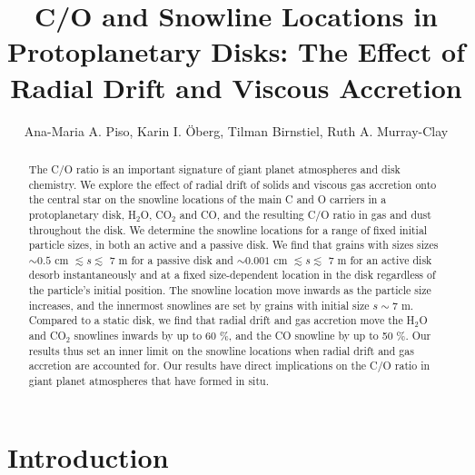 \documentclass[apj]{emulateapj}
\newcommand{\emgr}[1]{\emph{ \color{gray} #1}}
\begin{document}


\title{C/O and Snowline Locations in Protoplanetary Disks: The Effect of Radial Drift and Viscous Accretion}

\author{Ana-Maria A. Piso, Karin I. \"Oberg, Tilman Birnstiel, Ruth A. Murray-Clay}


\begin{abstract}
The C/O ratio is an important signature of giant planet atmospheres and disk chemistry. We explore the effect of radial drift of solids and viscous gas accretion onto the central star on the snowline locations of the main C and O carriers in a protoplanetary disk, H$_2$O, CO$_2$ and CO, and the resulting C/O ratio in gas and dust throughout the disk. We determine the snowline locations for a range of fixed initial particle sizes, in both an active and a passive disk. We find that grains with sizes sizes $\sim$$0.5$ cm $\lesssim s \lesssim$ 7 m for a passive disk and $\sim$$0.001$ cm $\lesssim s \lesssim$ 7 m for an active disk desorb instantaneously and at a fixed size-dependent location in the disk regardless of the particle's initial position. The snowline location move inwards as the particle size increases, and the innermost snowlines are set by grains with initial size $s\sim7$ m. Compared to a static disk, we find that radial drift and gas accretion move the H$_2$O and CO$_2$ snowlines inwards by up to 60 \%, and the CO snowline by up to 50 \%. Our results thus set an inner limit on the snowline locations when radial drift and gas accretion are accounted for. Our results
have direct implications on the C/O ratio in giant planet atmospheres that have
formed in situ. 
\end{abstract}

\section{Introduction}

\end{document}
